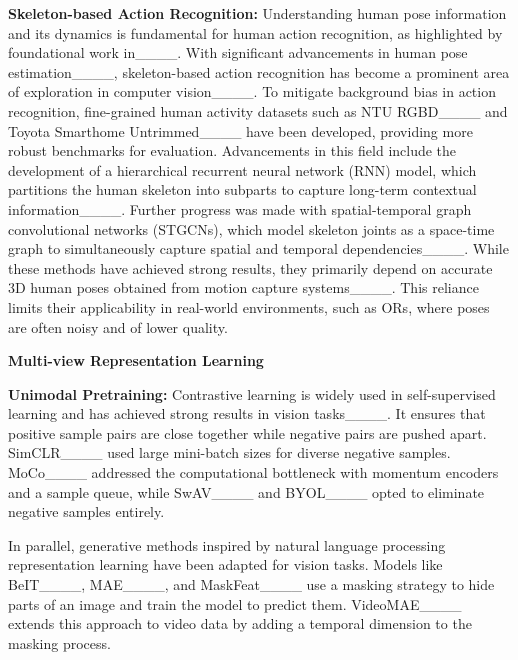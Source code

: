 \noindent \textbf{Skeleton-based Action Recognition: } Understanding human pose information and its dynamics is fundamental for human action recognition, as highlighted by foundational work in____. With significant advancements in human pose estimation____, skeleton-based action recognition has become a prominent area of exploration in computer vision____. To mitigate background bias in action recognition, fine-grained human activity datasets such as NTU RGBD____ and Toyota Smarthome Untrimmed____ have been developed, providing more robust benchmarks for evaluation. Advancements in this field include the development of a hierarchical recurrent neural network (RNN) model, which partitions the human skeleton into subparts to capture long-term contextual information____. Further progress was made with spatial-temporal graph convolutional networks (STGCNs), which model skeleton joints as a space-time graph to simultaneously capture spatial and temporal dependencies____. While these methods have achieved strong results, they primarily depend on accurate 3D human poses obtained from motion capture systems____. This reliance limits their applicability in real-world environments, such as ORs, where poses are often noisy and of lower quality.

\noindent \textbf{Multi-view Representation Learning}

\noindent \textbf{Unimodal Pretraining:} Contrastive learning is widely used in self-supervised learning and has achieved strong results in vision tasks____. It ensures that positive sample pairs are close together while negative pairs are pushed apart. 
SimCLR____ used large mini-batch sizes for diverse negative samples. MoCo____ addressed the computational bottleneck with momentum encoders and a sample queue, while SwAV____ and BYOL____ opted to eliminate negative samples entirely.


In parallel, generative methods inspired by natural language processing representation learning have been adapted for vision tasks. Models like BeIT____, MAE____, and MaskFeat____ use a masking strategy to hide parts of an image and train the model to predict them. VideoMAE____ extends this approach to video data by adding a temporal dimension to the masking process. %

